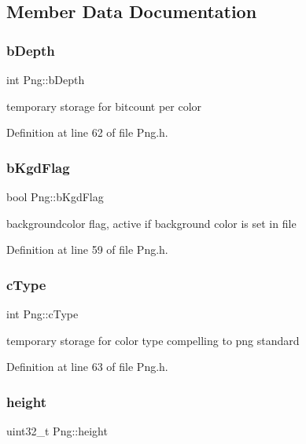 \subsection{Member Data Documentation}
\mbox{\label{classPng_a96907d5307f3d79f20c5daaea24c84fa}} 
\subsubsection{\texorpdfstring{bDepth}{bDepth}}
{\footnotesize\ttfamily int Png\+::b\+Depth\hspace{0.3cm}{\ttfamily [private]}}

temporary storage for bitcount per color 

Definition at line 62 of file Png.\+h.

\mbox{\label{classPng_ae40f44717df30fac8de85a5c9fa429d6}} 
\subsubsection{\texorpdfstring{bKgdFlag}{bKgdFlag}}
{\footnotesize\ttfamily bool Png\+::b\+Kgd\+Flag\hspace{0.3cm}{\ttfamily [private]}}

backgroundcolor flag, active if background color is set in file 

Definition at line 59 of file Png.\+h.

\mbox{\label{classPng_ae8acde4e85d5da0271325abfabb8a24c}} 
\subsubsection{\texorpdfstring{cType}{cType}}
{\footnotesize\ttfamily int Png\+::c\+Type\hspace{0.3cm}{\ttfamily [private]}}

temporary storage for color type compelling to png standard 

Definition at line 63 of file Png.\+h.

\mbox{\label{classPng_a46412756311804d40e8e8bf62633e40f}} 
\subsubsection{\texorpdfstring{height}{height}}
{\footnotesize\ttfamily uint32\+\_\+t Png\+::height\hspace{0.3cm}{\ttfamily [private]}}

